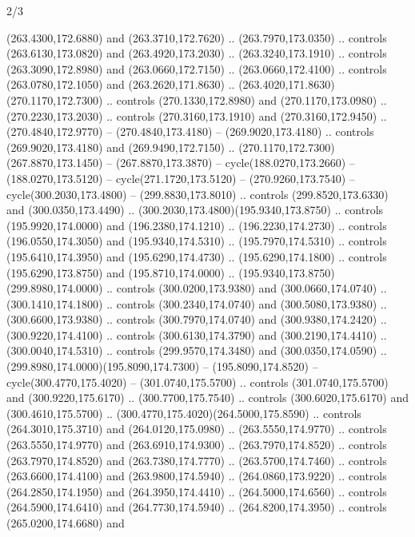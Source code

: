 \begin{flagdescription}{2/3}
\begin{scope}[xshift=0.5\flaglength,yshift=0.5\flagwidth,scale=\flagwidth/259.2]
\begin{scope}[y=0.8pt, x=0.8pt, yscale=-1,shift={(-243,-162)}]
      (263.4300,172.6880) and (263.3710,172.7620) .. (263.7970,173.0350) .. controls
      (263.6130,173.0820) and (263.4920,173.2030) .. (263.3240,173.1910) .. controls
      (263.3090,172.8980) and (263.0660,172.7150) .. (263.0660,172.4100) .. controls
      (263.0780,172.1050) and (263.2620,171.8630) ..
      (263.4020,171.8630)(270.1170,172.7300) .. controls (270.1330,172.8980) and
      (270.1170,173.0980) .. (270.2230,173.2030) .. controls (270.3160,173.1910) and
      (270.3160,172.9450) .. (270.4840,172.9770) -- (270.4840,173.4180) --
      (269.9020,173.4180) .. controls (269.9020,173.4180) and (269.9490,172.7150) ..
      (270.1170,172.7300)(267.8870,173.1450) -- (267.8870,173.3870) --
      cycle(188.0270,173.2660) -- (188.0270,173.5120) -- cycle(271.1720,173.5120) --
      (270.9260,173.7540) -- cycle(300.2030,173.4800) -- (299.8830,173.8010) ..
      controls (299.8520,173.6330) and (300.0350,173.4490) ..
      (300.2030,173.4800)(195.9340,173.8750) .. controls (195.9920,174.0000) and
      (196.2380,174.1210) .. (196.2230,174.2730) .. controls (196.0550,174.3050) and
      (195.9340,174.5310) .. (195.7970,174.5310) .. controls (195.6410,174.3950) and
      (195.6290,174.4730) .. (195.6290,174.1800) .. controls (195.6290,173.8750) and
      (195.8710,174.0000) .. (195.9340,173.8750)(299.8980,174.0000) .. controls
      (300.0200,173.9380) and (300.0660,174.0740) .. (300.1410,174.1800) .. controls
      (300.2340,174.0740) and (300.5080,173.9380) .. (300.6600,173.9380) .. controls
      (300.7970,174.0740) and (300.9380,174.2420) .. (300.9220,174.4100) .. controls
      (300.6130,174.3790) and (300.2190,174.4410) .. (300.0040,174.5310) .. controls
      (299.9570,174.3480) and (300.0350,174.0590) ..
      (299.8980,174.0000)(195.8090,174.7300) -- (195.8090,174.8520) --
      cycle(300.4770,175.4020) -- (301.0740,175.5700) .. controls
      (301.0740,175.5700) and (300.9220,175.6170) .. (300.7700,175.7540) .. controls
      (300.6020,175.6170) and (300.4610,175.5700) ..
      (300.4770,175.4020)(264.5000,175.8590) .. controls (264.3010,175.3710) and
      (264.0120,175.0980) .. (263.5550,174.9770) .. controls (263.5550,174.9770) and
      (263.6910,174.9300) .. (263.7970,174.8520) .. controls (263.7970,174.8520) and
      (263.7380,174.7770) .. (263.5700,174.7460) .. controls (263.6600,174.4100) and
      (263.9800,174.5940) .. (264.0860,173.9220) .. controls (264.2850,174.1950) and
      (264.3950,174.4410) .. (264.5000,174.6560) .. controls (264.5900,174.6410) and
      (264.7730,174.5940) .. (264.8200,174.3950) .. controls (265.0200,174.6680) and

\end{scope}
\end{scope}
\end{flagdescription}
